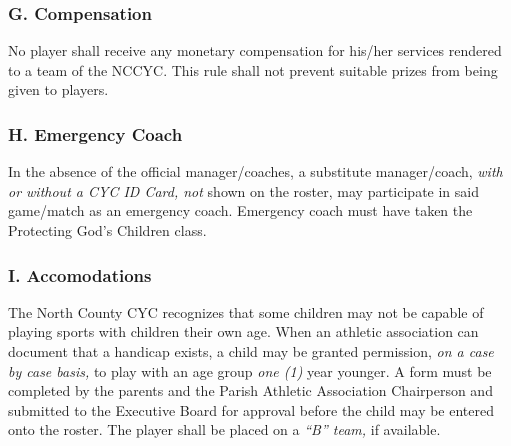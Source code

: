 \subsubsection{G. Compensation}
No player shall receive any monetary compensation for his/her services rendered to a team of the NCCYC. This rule shall not prevent suitable prizes from being given to players. 

\subsubsection{H. Emergency Coach}
In the absence of the official manager/coaches, a substitute manager/coach, {\em with or without a CYC ID Card, not} shown on the roster, may participate in said game/match as an emergency coach. Emergency coach must have taken the Protecting God’s Children class.

\subsubsection{I. Accomodations}
The North County CYC recognizes that some children may not be capable of playing sports with children their own age.  When an athletic association can document that a handicap exists, a child may be granted permission, {\em on a case by case basis,} to play with an age group {\em one (1)} year younger.  A form must be completed by the parents and the Parish Athlet­ic Association Chairperson and submitted to the Executive Board for approval before the child may be entered onto the roster.  The player shall be placed on a {\em ``B'' team,} if available.

